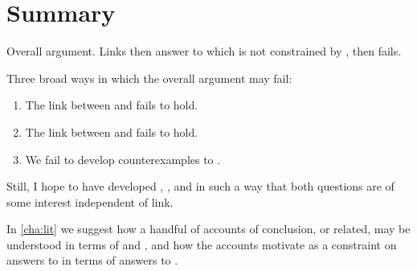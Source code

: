 
\section*{Summary}

\begin{note}
  Overall argument.
  Links then answer to \qWhyV{} which is not constrained by \qHowV{}, then \issueInclusion{} fails.

  Three broad ways in which the overall argument may fail:
  \begin{enumerate}[label=\arabic*., ref=(\arabic*), noitemsep]
  \item
    The link between \qWhyV{} and \qWhy{} fails to hold.
  \item
    The link between \qHowV{} and \qHow{} fails to hold.
  \item
    We fail to develop counterexamples to \issueConstraint{}.
  \end{enumerate}

  Still, I hope to have developed \qWhyV{}, \qHowV{}, and \issueConstraint{} in such a way that both questions are of some interest independent of link.
\end{note}

\begin{note}
  In \autoref{cha:lit} we suggest how a handful of accounts of conclusion, or related, may be understood in terms of \qWhyV{} and \qHowV{}, and how the accounts motivate \issueConstraint{} as a constraint on answers to \qWhyV{} in terms of answers to \qHowV{}.
\end{note}








